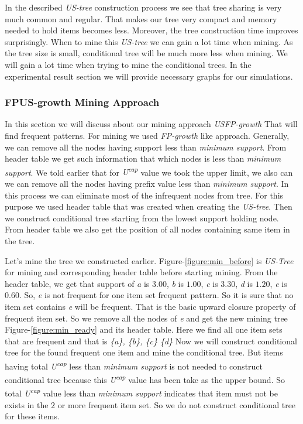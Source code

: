 \documentclass[conference]{IEEEtran}
\begin{document}
    
    In the described \emph{US-tree} construction process we see that tree sharing is very much common and regular. That makes our tree very compact and memory needed to hold items becomes less. Moreover, the tree construction time improves surprisingly. When to mine this \emph{US-tree} we can gain a lot time when mining. As the tree size is small, conditional tree will be much more less when mining. We will gain a lot time when trying to mine the conditional trees. In the experimental result section we will provide necessary graphs for our simulations.
\subsubsection{FPUS-growth Mining Approach}
In this section we will discuss about our mining approach \emph{USFP-growth} That will find frequent patterns. For mining we used \emph{FP-growth} like approach. Generally, we can remove all the nodes having support less than \emph{minimum support}. From header table we get such information that which nodes is less than \emph{minimum support}. We told earlier that for \emph{U\textsuperscript{cap}} value we took the upper limit, we also can we can remove all the nodes having prefix value less than \emph{minimum support}. In this process we can eliminate most of the infrequent nodes from tree. For this purpose we used header table that was created when creating the \emph{US-tree}. Then we construct conditional tree starting from the lowest support holding node. From header table we also get the position of all nodes containing same item in the tree.

Let’s mine the tree we constructed earlier. Figure-\ref{figure:min_before} is \emph{US-Tree} for mining and corresponding header table before starting mining. From the header table, we get that support of \emph{a} is $3.00$, \emph{b} is $1.00$, \emph{c} is $3.30$, \emph{d} is $1.20$, \emph{e} is $0.60$. So, \emph{e} is not frequent for one item set frequent pattern. So it is sure that no item set contains \emph{e} will be frequent. That is the basic upward closure property of frequent item set. So we remove all the nodes of \emph{e} and get the new mining tree Figure-\ref{figure:min_ready} and its header table. Here we find all one item sets that are frequent and that is \emph{\{a\}, \{b\}, \{c\} \{d\}} Now we will construct conditional tree for the found frequent one item and mine the conditional tree. But items having total \emph{U\textsuperscript{cap}} less than \emph{minimum support} is not needed to construct conditional tree because this \emph{U\textsuperscript{cap}} value has been take as the upper bound. So total \emph{U\textsuperscript{cap}} value less than \emph{minimum support} indicates that item must not be exists in the $2$ or more frequent item set. So we do not construct conditional tree for these items.
\end{document}
